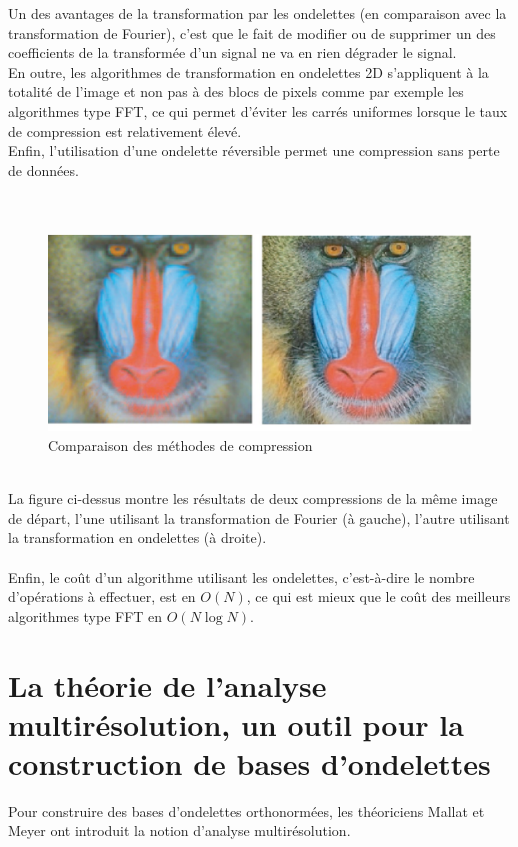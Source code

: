 \documentclass{article}
\begin{document}
Un des avantages de la transformation par les ondelettes (en comparaison avec la transformation de Fourier), c'est que le fait de modifier ou de supprimer un des coefficients de la transformée d'un signal ne va en rien dégrader le signal. \\
En outre, les algorithmes de transformation en ondelettes 2D s'appliquent à la totalité de l'image et non pas à des blocs de pixels comme par exemple les algorithmes type FFT, ce qui permet d'éviter les carrés uniformes lorsque le taux de compression est relativement élevé. \\
Enfin, l'utilisation d'une ondelette réversible permet une compression sans perte de données. \\ \\ \\
\begin{figure}[!h]
\centering
\includegraphics[scale=0.4]{images/comparaison.jpg}
\caption{Comparaison des méthodes de compression}
\end{figure} \\
La figure ci-dessus montre les résultats de deux compressions de la même image de départ, l'une utilisant la transformation de Fourier (à gauche), l'autre utilisant la transformation en ondelettes (à droite). \\ \\
Enfin, le coût d'un algorithme utilisant les ondelettes, c'est-à-dire le nombre d'opérations à effectuer, est en $O(N)$, ce qui est mieux que le coût des meilleurs algorithmes type FFT en $O(N\log N)$.



\section{La théorie de l'analyse multirésolution, un outil pour la construction de bases d'ondelettes}

Pour construire des bases d'ondelettes orthonormées, les théoriciens Mallat et Meyer ont introduit la notion d'analyse multirésolution.
\end{document}
